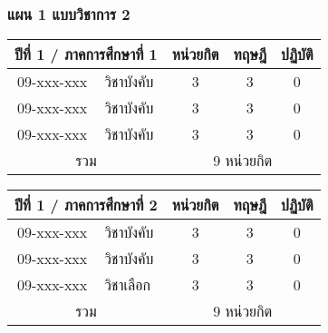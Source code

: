\newpage
\subsubsection*{แผน 1 แบบวิชาการ 2}

\renewcommand{\arraystretch}{1.4}
\begin{tabular}{|cp{}|ccc|}
\hline
\multicolumn{2}{|c|}{ปีที่ 1 / ภาคการศึกษาที่ 1} & \multicolumn{1}{c|}{หน่วยกิต} & \multicolumn{1}{c|}{ทฤษฎี} & \multicolumn{1}{c|}{ปฏิบัติ}  \\ \hline
\multicolumn{1}{|c|}{09-xxx-xxx}  & วิชาบังคับ  & \multicolumn{1}{c|}{3}        & \multicolumn{1}{c|}{3}     & \multicolumn{1}{c|}{0}                   \\ \hline
\multicolumn{1}{|c|}{09-xxx-xxx}  & วิชาบังคับ  & \multicolumn{1}{c|}{3}        & \multicolumn{1}{c|}{3}     & \multicolumn{1}{c|}{0}                    \\ \hline
\multicolumn{1}{|c|}{09-xxx-xxx}  & วิชาบังคับ  & \multicolumn{1}{c|}{3}        & \multicolumn{1}{c|}{3}     & \multicolumn{1}{c|}{0}                   \\ \hline
\multicolumn{2}{|c|}{รวม}                        & \multicolumn{3}{c|}{9 หน่วยกิต}                                                                            \\ \hline
\end{tabular}

\vspace{5ex}\par\noindent
\renewcommand{\arraystretch}{1.4}
\begin{tabular}{|cp{}|ccc|}
\hline
\multicolumn{2}{|c|}{ปีที่ 1 / ภาคการศึกษาที่ 2} & \multicolumn{1}{c|}{หน่วยกิต} & \multicolumn{1}{c|}{ทฤษฎี} & \multicolumn{1}{c|}{ปฏิบัติ}  \\ \hline
\multicolumn{1}{|c|}{09-xxx-xxx}  & วิชาบังคับ  & \multicolumn{1}{c|}{3}        & \multicolumn{1}{c|}{3}     & \multicolumn{1}{c|}{0}                    \\ \hline
\multicolumn{1}{|c|}{09-xxx-xxx}  & วิชาบังคับ  & \multicolumn{1}{c|}{3}        & \multicolumn{1}{c|}{3}     & \multicolumn{1}{c|}{0}                    \\ \hline
\multicolumn{1}{|c|}{09-xxx-xxx}  & วิชาเลือก  & \multicolumn{1}{c|}{3}        & \multicolumn{1}{c|}{3}     & \multicolumn{1}{c|}{0}                   \\ \hline
\multicolumn{2}{|c|}{รวม}                        & \multicolumn{3}{c|}{9 หน่วยกิต}                                                                            \\ \hline
\end{tabular}

